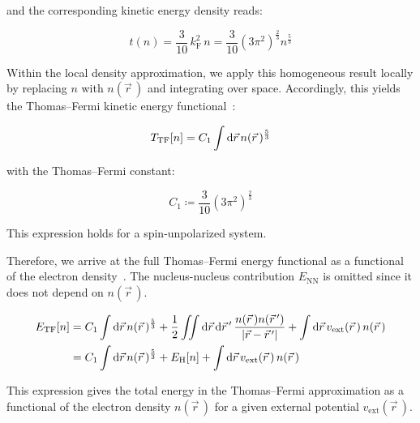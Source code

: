 and the corresponding kinetic energy density reads:

\begin{equation}
    t(n) = \frac{3}{10}\,k_\mathrm{F}^2\,n
    = \frac{3}{10}\left(3\pi^2\right)^{\frac{2}{3}}n^{\frac{5}{3}}
\label{kinetic_energy_density_homogeneous_gas}
\end{equation}

Within the local density approximation,
we apply this homogeneous result locally by replacing $n$ with $n(\vec{r}\,)$ and integrating over space.
Accordingly, this yields the Thomas--Fermi kinetic energy functional~\cite{thomas1927calculation,fermi1927metodo,mi2023orbital}:

\begin{equation}
    T_\mathrm{TF}[n] = C_1\int\mathrm{d}{\vec{r}}\,n(\vec{r}\,)^{\frac{5}{3}}
\label{functional_TTF}
\end{equation}

with the Thomas--Fermi constant:

\begin{equation}
    C_1 \coloneqq \frac{3}{10}\left(3\pi^2\right)^{\frac{2}{3}} 
\label{Thomas_Fermi_constant_C1}
\end{equation}

This expression holds for a spin-unpolarized system.

Therefore, we arrive at the full Thomas--Fermi energy functional as a functional of the electron density~\cite{garcia2007efficient,xu2024recent}.
The nucleus-nucleus contribution $E_\mathrm{NN}$ is omitted since it does not depend on $n(\vec{r}\,)$.

\begin{equation}
\begin{aligned}
    E_\mathrm{TF}[n]
    &= C_1\int\mathrm{d}{\vec{r}}\,n(\vec{r}\,)^{\frac{5}{3}}
    + \frac{1}{2}\iint\mathrm{d}{\vec{r}}\,\mathrm{d}{\vec{r}\,'}\,\frac{n(\vec{r}\,)n(\vec{r}\,')}{|\vec{r}-\vec{r}\,'|}
    + \int\mathrm{d}{\vec{r}}\,v_\mathrm{ext}(\vec{r}\,)\,n(\vec{r}\,) \\
    &= C_1\int\mathrm{d}{\vec{r}}\,n(\vec{r}\,)^{\frac{5}{3}}
    + E_\mathrm{H}[n] + \int\mathrm{d}{\vec{r}}\,v_\mathrm{ext}(\vec{r}\,)\,n(\vec{r}\,)
\end{aligned}
\label{full_energy_functional}
\end{equation}

This expression gives the total energy in the Thomas--Fermi approximation as a functional of the electron density $n(\vec{r}\,)$ for a given external potential $v_\mathrm{ext}(\vec{r}\,)$.

